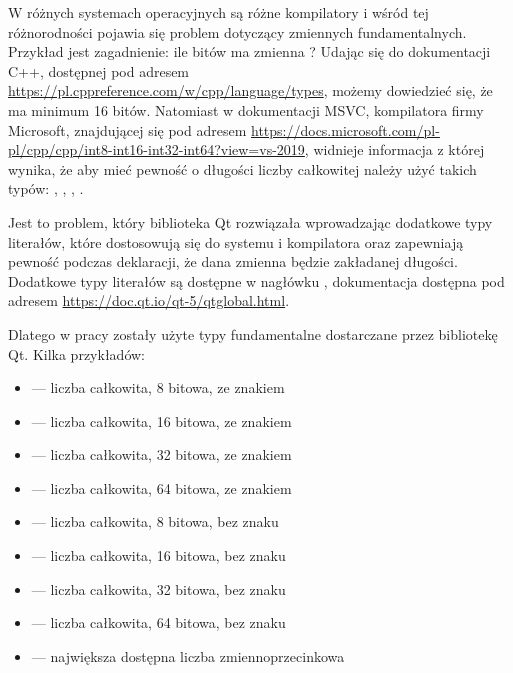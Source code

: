 \par
W różnych systemach operacyjnych są różne kompilatory i wśród tej różnorodności pojawia się problem dotyczący zmiennych fundamentalnych.
Przykład jest zagadnienie: ile bitów ma zmienna ?
Udając się do dokumentacji C++, dostępnej pod adresem \url{https://pl.cppreference.com/w/cpp/language/types}, możemy dowiedzieć się, że  ma minimum 16 bitów.
Natomiast w dokumentacji MSVC, kompilatora firmy Microsoft, znajdującej się pod adresem \url{https://docs.microsoft.com/pl-pl/cpp/cpp/int8-int16-int32-int64?view=vs-2019}, widnieje informacja z której wynika, że aby mieć pewność o długości liczby całkowitej należy użyć takich typów: , , , .
\par
Jest to problem, który biblioteka Qt rozwiązała wprowadzając dodatkowe typy literałów, które dostosowują się do systemu i kompilatora oraz zapewniają pewność podczas deklaracji, że dana zmienna będzie zakładanej długości.
Dodatkowe typy literałów są dostępne w nagłówku , dokumentacja dostępna pod adresem \url{https://doc.qt.io/qt-5/qtglobal.html}.

\par
Dlatego w pracy zostały użyte typy fundamentalne dostarczane przez bibliotekę Qt.
Kilka przykładów:
\begin{itemize}
    \item {} --- liczba całkowita, 8 bitowa, ze znakiem
    \item {} --- liczba całkowita, 16 bitowa, ze znakiem
    \item {} --- liczba całkowita, 32 bitowa, ze znakiem
    \item {} --- liczba całkowita, 64 bitowa, ze znakiem
    \item {} --- liczba całkowita, 8 bitowa, bez znaku
    \item {} --- liczba całkowita, 16 bitowa, bez znaku
    \item {} --- liczba całkowita, 32 bitowa, bez znaku
    \item {} --- liczba całkowita, 64 bitowa, bez znaku
    \item {} --- największa dostępna liczba zmiennoprzecinkowa
\end{itemize}
